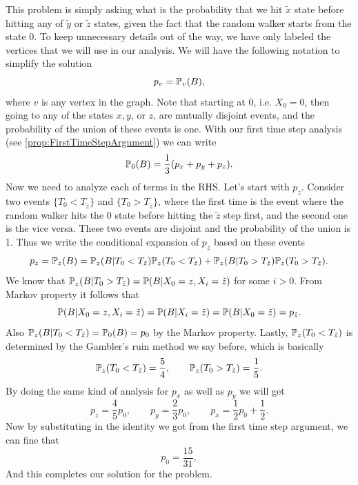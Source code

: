 \begin{solution}
	This problem is simply asking what is the probability that we hit $\tilde{x}$ state before hitting any of $\tilde{y}$ or $\tilde{z}$ states, given the fact that the random walker starts from the state $0$. To keep unnecessary details out of the way, we have only labeled the vertices that we will use in our analysis. We will have the following notation to simplify the solution
	\[ p_v = \mathbb{P}_v(B), \]
	where $v$ is any vertex in the graph. Note that starting at 0, i.e. $X_0=0$, then going to any of the states $x,y$, or $z$, are mutually disjoint events, and the probability of the union of these events is one. With our first time step analysis (see \autoref{prop:FirstTimeStepArgument}) we can write
	\[ \mathbb{P}_0(B) = \frac{1}{3} ( p_x + p_y + p_z). \]
	Now we need to analyze each of terms in the RHS. Let's start with $p_z$. Consider two events $\{ T_0 < T_{\tilde{z}}  \}$ and $\{ T_0 > T_{\tilde{z}}  \}$, where the first time is the event where the random walker hits the $0$ state before hitting the $\tilde{z}$ step first, and the second one is the vice versa. These two events are disjoint and the probability of the union is 1. Thus we write the conditional expansion of $p_z$ based on these events
	\[ p_z = \mathbb{P}_z(B) = \mathbb{P}_z(B|T_0 < T_{\tilde{z}})\mathbb{P}_z(T_0 < T_{\tilde{z}}) + \mathbb{P}_z(B|T_0 > T_{\tilde{z}})\mathbb{P}_z(T_0 > T_{\tilde{z}}). \]
	We know that $\mathbb{P}_z(B|T_0 > T_{\tilde{z}}) = \mathbb{P}(B|X_0=z,X_i=\tilde{z})$ for some $i > 0$. From Markov property it follows that 
	\[ \mathbb{P}(B|X_0=z,X_i=\tilde{z}) = \mathbb{P}(B|X_i=\tilde{z}) = \mathbb{P}(B|X_0 = \tilde{z})  = p_{\tilde{z}}.\]
	Also $\mathbb{P}_z(B|T_0<T_{\tilde{z}}) = \mathbb{P}_0(B) = p_0$ by the Markov property. Lastly, $\mathbb{P}_z(T_0<T_{\tilde{z}})$ is determined by the Gambler's ruin method we say before, which is basically
	\[ \mathbb{P}_z(T_0 < T_{\tilde{z}}) = \frac{5}{4}, \qquad \mathbb{P}_z(T_0>T_{\tilde{z}}) = \frac{1}{5}. \]
	By doing the same kind of analysis for $p_x$ as well as $p_y$ we will get
	\[ p_z = \frac{4}{5}p_0 , \qquad p_y = \frac{2}{3}p_0, \qquad p_x =\frac{1}{2}p_0 + \frac{1}{2}. \]
	Now by substituting in the identity we got from the first time step argument, we can fine that 
	\[ p_0 = \frac{15}{31}, \]
	And this completes our solution for the problem.
\end{solution}

